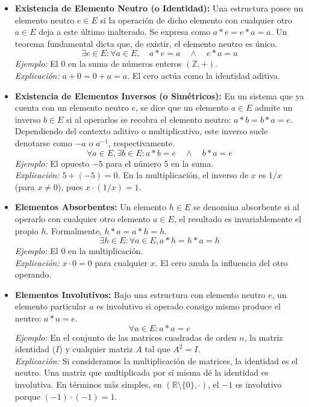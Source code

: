 \documentclass{article}
\begin{document}
\begin{itemize}
\item \textbf{Existencia de Elemento Neutro (o Identidad):} Una estructura posee un elemento neutro $e \in E$ si la operación de dicho elemento con cualquier otro $a \in E$ deja a este último inalterado. Se expresa como $a * e = e * a = a$. Un teorema fundamental dicta que, de existir, el elemento neutro es único.
$$\exists e \in E : \forall a \in E, \quad a * e = a \quad \wedge \quad e * a = a$$
\textit{Ejemplo:} El $0$ en la suma de números enteros $(\mathbb{Z}, +)$.\\
\textit{Explicación:} $a + 0 = 0 + a = a$. El cero actúa como la identidad aditiva.

    
\item \textbf{Existencia de Elementos Inversos (o Simétricos):} En un sistema que ya cuenta con un elemento neutro $e$, se dice que un elemento $a \in E$ admite un inverso $b \in E$ si al operarlos se recobra el elemento neutro: $a * b = b * a = e$. Dependiendo del contexto aditivo o multiplicativo, este inverso suele denotarse como $-a$ o $a^{-1}$, respectivamente.
$$\forall a \in E, \exists b \in E : a * b = e \quad \wedge \quad b * a = e$$
\textit{Ejemplo:} El opuesto $-5$ para el número $5$ en la suma.\\
\textit{Explicación:} $5 + (-5) = 0$. En la multiplicación, el inverso de $x$ es $1/x$ (para $x \neq 0$), pues $x \cdot (1/x) = 1$.
\bigskip
    
\item \textbf{Elementos Absorbentes:} Un elemento $h \in E$ se denomina absorbente si al operarlo con cualquier otro elemento $a \in E$, el resultado es invariablemente el propio $h$. Formalmente, $h * a = a * h = h. $
\[ \exists h \in E : \forall a \in E, a * h = h * a = h \]
\textit{Ejemplo:} El $0$ en la multiplicación.\\
\textit{Explicación:} $x \cdot 0 = 0$ para cualquier $x$. El cero anula la influencia del otro operando.
\bigskip

\item \textbf{Elementos Involutivos:} Bajo una estructura con elemento neutro $e$, un elemento particular $a$ es involutivo si operado consigo mismo produce el neutro: $a * a = e$.
\[ \forall a \in E : a * a = e \]
\textit{Ejemplo:} En el conjunto de las matrices cuadradas de orden $n$, la matriz identidad ($I$) y cualquier matriz $A$ tal que $A^2 = I$. \\
\textit{Explicación:} Si consideramos la multiplicación de matrices, la identidad es el neutro. Una matriz que multiplicada por sí misma dé la identidad es involutiva. En términos más simples, en $(\mathbb{R} \setminus \{0\}, \cdot)$, el $-1$ es involutivo porque $(-1) \cdot (-1) = 1$.
\bigskip


\end{itemize}
\end{document}

